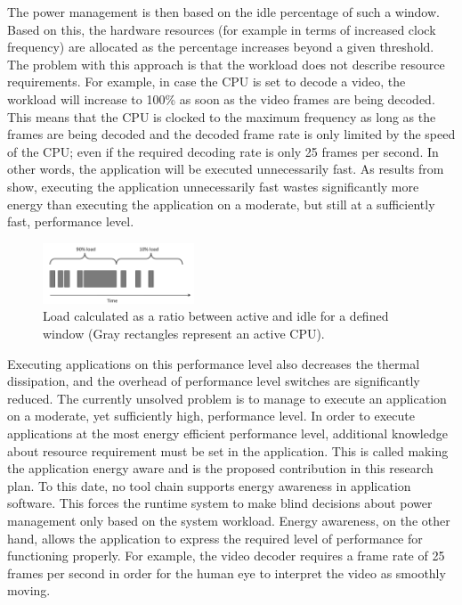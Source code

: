 \documentclass{article}
\begin{document}
The power management is then based on the idle percentage of such a window. 
Based on this, the hardware resources (for example in terms of increased clock frequency) are allocated as the percentage increases beyond a given threshold. 
The problem with this approach is that the workload does not describe resource requirements. 
For example, in case the CPU is set to decode a video, the workload will increase to 100\% as soon as the video frames are being decoded.  
This means that the CPU is clocked to the maximum frequency as long as the frames are being decoded and the decoded frame rate is only limited by the speed of the CPU; 
even if the required decoding rate is only 25 frames per second. In other words, the application will be executed unnecessarily fast. 
As results from \cite{HolmbackaHipeac, HolmbackaDasip} show, executing the application unnecessarily fast wastes significantly more energy than executing the application on a moderate, 
but still at a sufficiently fast, performance level. 
\begin{figure}
  \begin{center}
    \includegraphics[width=0.4\textwidth]{fig/workload.png}
  \end{center}
  \caption{Load calculated as a ratio between active and idle for a defined window (Gray rectangles represent an active CPU).}
  \label{fig:workload}
\end{figure}
Executing applications on this performance level also decreases the thermal dissipation, and the overhead of performance level switches are significantly reduced.
The currently unsolved problem is to manage to execute an application on a moderate, yet sufficiently high, performance level. 
In order to execute applications at the most energy efficient performance level, additional knowledge about resource requirement must be set in the application. 
This is called making the application energy aware and is the proposed contribution in this research plan. To this date, no tool chain supports energy awareness in application software. 
This forces the runtime system to make blind decisions about power management only based on the system workload. 
Energy awareness, on the other hand, allows the application to express the required level of performance for functioning properly. 
For example, the video decoder requires a frame rate of 25 frames per second in order for the human eye to interpret the video as smoothly moving. 
\end{document}
